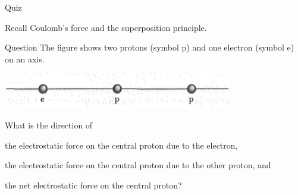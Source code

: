 {
\problemslide

\begin{frame}{Quiz}

Recall Coulomb's force and the superposition principle.\\
\vspace{0.2cm}

\begin{blockexmplque}{Question}
  The figure shows two protons (symbol p) and one electron (symbol e) on an axis.
  \begin{center}
    \includegraphics[width=0.75\textwidth]{./images/problems/lect1_quiz_epp_charges.png}
  \end{center}
  What is the direction of
  \begin{enumerate}
    {\small
    \item the electrostatic force on the central proton due to the electron,
    \item the electrostatic force on the central proton due to the other proton, and
    \item the net electrostatic force on the central proton?\\
    }
  \end{enumerate}

\end{blockexmplque}


\end{frame}

} %


%
%

